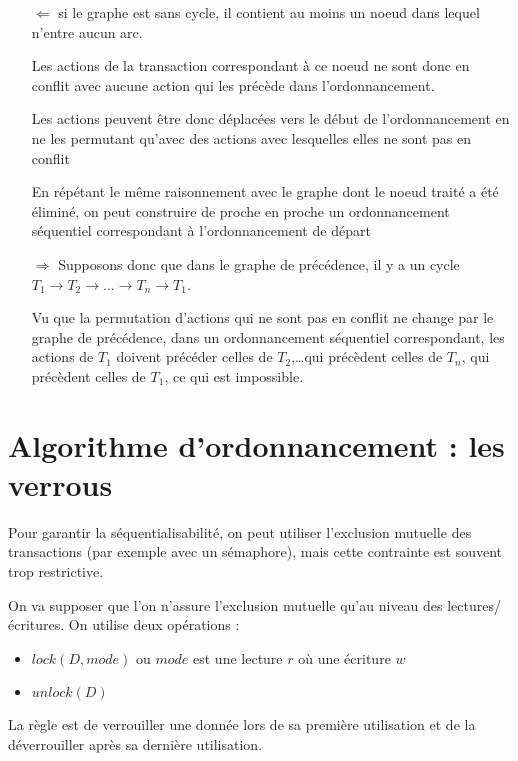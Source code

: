 		\begin{itemize}
			\item[$\Leftarrow$] si le graphe est sans cycle, il contient au moins un noeud dans lequel n'entre aucun arc.
			
			Les actions de la transaction correspondant à ce noeud ne sont donc en conflit avec aucune action qui les précède dans l'ordonnancement.
			
			Les actions peuvent être donc déplacées vers le début de l'ordonnancement en ne les permutant qu'avec des actions avec lesquelles elles ne sont pas en conflit
			
			En répétant le même raisonnement avec le graphe dont le noeud traité a été éliminé, on peut construire de proche en proche un ordonnancement séquentiel correspondant à l'ordonnancement de départ
			
			\item[$\Rightarrow$] Supposons donc que dans le graphe de précédence, il y a un cycle $T_1 \rightarrow T_2 \rightarrow \dots \rightarrow T_n \rightarrow T_1$.
			
			Vu que la permutation d'actions qui ne sont pas en conflit ne change par le graphe de précédence, dans un ordonnancement séquentiel correspondant, les actions de $T_1$ doivent précéder celles de $T_2$,\dots qui précèdent celles de $T_n$, qui précèdent celles de $T_1$, ce qui est impossible.
			\end{itemize}
			
	\section{Algorithme d'ordonnancement : les verrous}
	
	Pour garantir la séquentialisabilité, on peut utiliser l'exclusion mutuelle des transactions (par exemple avec un sémaphore), mais cette contrainte est souvent trop restrictive.
	
	On va supposer que l'on n'assure l'exclusion mutuelle qu'au niveau des lectures/écritures. On utilise deux opérations :
	
	\begin{itemize}
		\item $lock(D, mode)$ ou $mode$ est une lecture $r$ où une écriture $w$
		\item $unlock(D)$
	\end{itemize}
		
	La règle est de verrouiller une donnée lors de sa première utilisation et de la déverrouiller après sa dernière utilisation.
	

